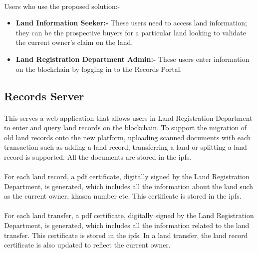\documentclass[12pt]{article}
\begin{document}
    \paragraph{}
    Users who use the proposed solution:-
    \begin{itemize}
        \item \textbf{Land Information Seeker:-} These users need to access land information; they can be the prospective buyers for a particular land looking to validate the current owner's claim on the land.
        \item \textbf{Land Registration Department Admin:-} These users enter information on the blockchain by logging in to the Records Portal.
    \end{itemize}

    \subsection{Records Server}
        \paragraph{}
        This serves a web application that allows users in Land Registration Department to enter and query land records on the blockchain. To support the migration of old land records onto the new platform, uploading scanned documents with each transaction such as adding a land record, transferring a land or splitting a land record is supported. All the documents are stored in the \acrshort{ipfs}.

        \paragraph{}
        For each land record, a \acrshort{pdf} certificate, digitally signed by the Land Registration Department, is generated, which includes all the information about the land such as the current owner, khasra number etc. This certificate is stored in the \acrshort{ipfs}.
        
        \paragraph{}
        For each land transfer, a \acrshort{pdf} certificate, digitally signed by the Land Registration Department, is generated, which includes all the information related to the land transfer. This certificate is stored in the \acrshort{ipfs}. In a land transfer, the land record certificate is also updated to reflect the current owner.
\end{document}
